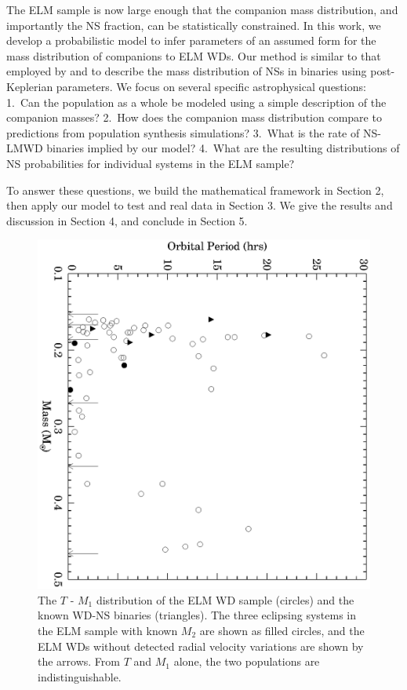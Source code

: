 \documentclass[apjl]{emulateapj}
\newcommand{\period}{T}
\begin{document}
The ELM sample is now large enough that the companion mass distribution, and importantly the NS fraction, can be statistically constrained. In this work, we develop a probabilistic model to infer parameters of an assumed form for the mass distribution of companions to ELM WDs. Our method is similar to that employed by \citet{ozel12} and \citet{kiziltan13} to describe the mass distribution of NSs in binaries using post-Keplerian parameters. We focus on several specific astrophysical questions: 1.\ Can the population as a whole be modeled using a simple description of the companion masses? 2.\ How does the companion mass distribution compare to predictions from population synthesis simulations?  3.\ What is the rate of NS-LMWD binaries implied by our model? 4.\ What are the resulting distributions of NS probabilities for individual systems in the ELM sample? 


To answer these questions, we build the mathematical framework in Section 2, then apply our model to test and real data in Section 3. We give the results and discussion in Section 4, and conclude in Section 5.

\begin{figure}[h!]
\begin{center}
\includegraphics[angle=90,width=0.95\columnwidth]{Porb_M1.eps}
\caption{The $\period$ - $M_1$ distribution of the ELM WD sample (circles) and the known WD-NS binaries (triangles). The three eclipsing systems in the ELM sample with known $M_2$ are shown as filled circles, and the ELM WDs without detected radial velocity variations are shown by the arrows. From $\period$ and $M_1$ alone, the two populations are indistinguishable.}
\label{fig:Porb-M1}
\end{center}
\end{figure}
\end{document}
